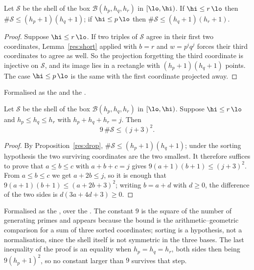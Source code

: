 \begin{proposition}\label{res:drop}
Let $\mathcal S$ be the shell of the box $\mathcal B(h_p,h_q,h_r)$ in
$[\lo,\hi)$.  If $\hi\le r\,\lo$ then $\#\mathcal S\le(h_p+1)(h_q+1)$; if
$\hi\le p\,\lo$ then $\#\mathcal S\le(h_q+1)(h_r+1)$.
\end{proposition}

\begin{proof}
Suppose $\hi\le r\,\lo$.  If two triples of $\mathcal S$ agree in their first
two coordinates, Lemma~\ref{res:short} applied with $b=r$ and $w=p^{i}q^{j}$
forces their third coordinates to agree as well.  So the projection forgetting
the third coordinate is injective on $\mathcal S$, and its image lies in a
rectangle with $(h_p+1)(h_q+1)$ points.  The case $\hi\le p\,\lo$ is the same
with the first coordinate projected away.
\end{proof}

\noindent Formalised as the
 and the
.

\begin{theorem}\label{res:shell}
Let $\mathcal S$ be the shell of the box $\mathcal B(h_p,h_q,h_r)$ in
$[\lo,\hi)$.  Suppose $\hi\le r\,\lo$ and $h_p\le h_q\le h_r$ with
$h_p+h_q+h_r=j$.  Then
\[
 9\,\#\mathcal S\le(j+3)^{2}.
\]
\end{theorem}

\begin{proof}
By Proposition~\ref{res:drop}, $\#\mathcal S\le(h_p+1)(h_q+1)$; under the
sorting hypothesis the two surviving coordinates are the two smallest.  It
therefore
suffices to prove that $a\le b\le c$ with $a+b+c=j$ gives
$9(a+1)(b+1)\le(j+3)^{2}$.  From $a\le b\le c$ we get $a+2b\le j$, so it is
enough that $9(a+1)(b+1)\le(a+2b+3)^{2}$; writing $b=a+d$ with $d\ge0$, the
difference of the two sides is $d(3a+4d+3)\ge0$.
\end{proof}

\noindent Formalised as the
, over the
.  The constant $9$ is the square of the number of
generating primes and appears because the bound is the arithmetic--geometric
comparison for a sum of three sorted coordinates; sorting is a hypothesis, not
a normalisation, since the shell itself is not symmetric in the three bases.
The last inequality of the proof is an equality when $h_p=h_q=h_r$, both sides
then being $9(h_p+1)^{2}$, so no constant larger than $9$ survives that step.

